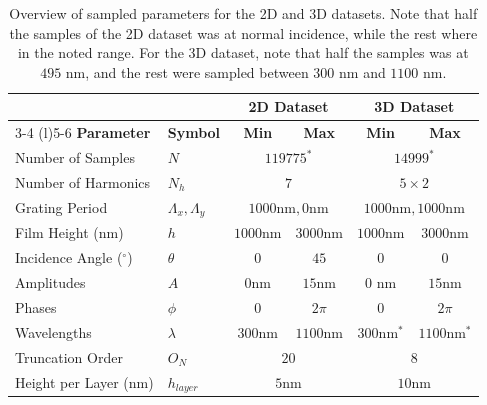 \begin{table}[htbp]
\centering
\caption{Overview of sampled parameters for the 2D and 3D datasets. Note that half the samples of the 2D dataset was at normal incidence, while the rest where in the noted range. For the 3D dataset, note that half the samples was at $495$ nm, and the rest were sampled between $300$ nm and $1100$ nm.}
\label{tab:sampled_parameters}
\begin{tabular}{@{}llcccc@{}}
\toprule
& & \multicolumn{2}{c}{\textbf{2D Dataset}} & \multicolumn{2}{c}{\textbf{3D Dataset}} \\
\cmidrule(lr){3-4} \cmidrule(l){5-6}
\textbf{Parameter} & \textbf{Symbol} & \textbf{Min} & \textbf{Max} & \textbf{Min} & \textbf{Max} \\
\midrule
Number of Samples & $N$ & \multicolumn{2}{c}{$119775^*$} & \multicolumn{2}{c}{$14999^*$} \\
Number of Harmonics & $N_h$ & \multicolumn{2}{c}{$7$} & \multicolumn{2}{c}{$5\times 2$} \\
Grating Period & $\Lambda_x, \Lambda_y$ & \multicolumn{2}{c}{$1000 \text{nm}, 0 \text{nm}$} & \multicolumn{2}{c}{$1000 \text{nm}, 1000\text{nm}$} \\
Film Height (nm) & $h$ & $1000 \text{nm} $& $3000 \text{nm}$ & $1000 \text{nm}$ & $3000 \text{nm}$ \\
Incidence Angle ($^\circ$) & $\theta$ & $0$ & $45$ & $0$ & $0$ \\
Amplitudes & $A$ & $0 \text{nm}$ & $15 \text{nm} $& 0 $\text{nm}$& $15 \text{nm}$ \\
Phases & $\phi$ & $0$ & $2\pi$ & $0$ & $2\pi$ \\
Wavelengths & $\lambda$ & $300\text{nm}$ & $1100 \text{nm}$ & $300 \text{nm}^*$ & $1100 \text{nm}^*$\\
Truncation Order & $O_N$ & \multicolumn{2}{c}{$20$} & \multicolumn{2}{c}{$8$} \\
Height per Layer (nm) & $h_{layer}$ & \multicolumn{2}{c}{$5\text{nm}$} & \multicolumn{2}{c}{$10 \text{nm}$ } \\
\bottomrule
\end{tabular}
\end{table}


